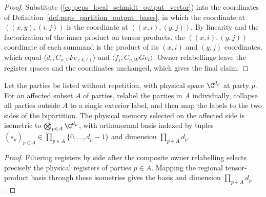 \begin{proof}\leanok
    Substitute (\ref{eq:peps_local_schmidt_output_vector}) into the coordinates
    of Definition~\ref{def:peps_partition_output_bases}, in which the
    coordinate at $((x,y),(i,j))$ is the coordinate at $((x,i),(y,j))$. By linearity and the factorization of the inner
    product on tensor products, the $((x,i),(y,j))$ coordinate of each summand
    is the product of its $(x,i)$ and $(y,j)$ coordinates, which equal
    $\langle d_i,C_{x,V}F e_{(k,t)}\rangle$ and
    $\langle f_j,C_{y,W}G e_t\rangle$. Owner relabellings leave the
    register spaces and the coordinates unchanged, which gives the final claim.
\end{proof}

\begin{lemma}
    \label{thm:peps_affected_original_dimensions}
    \leanok
    Let the parties be listed without repetition, with physical space
    $\C^{d_p}$ at party $p$. For an affected subset $A$ of parties, relabel
    the parties in $A$ individually, collapse all parties outside $A$ to a
    single exterior label, and then map the labels to the two sides of the
    bipartition. The physical memory selected on the affected side is
    isometric to $\bigotimes_{p\in A}\C^{d_p}$, with orthonormal basis indexed
    by tuples $(s_p)_{p\in A}\in\prod_{p\in A}\{0,\ldots,d_p-1\}$ and dimension
    $\prod_{p\in A}d_p$.
\end{lemma}

\begin{proof}\leanok
    Filtering registers by side after the composite owner relabelling selects
    precisely the physical registers of parties $p\in A$. Mapping the
    regional tensor-product basis through these isometries gives the basis and
    dimension $\prod_{p\in A}d_p$.
\end{proof}
